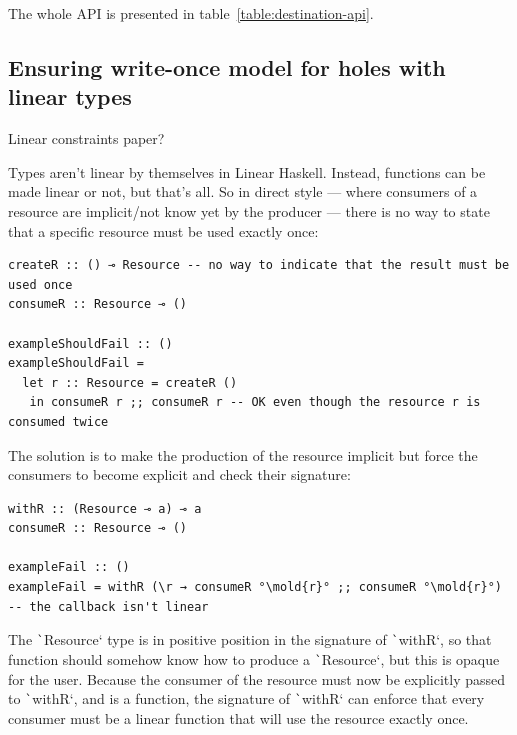 \documentclass[english]{jflart}
\newcommand{\TODO}[1]{{\color{red}\large #1}}
\newcommand{\mold}[1]{\colorbox{red}{#1}}
\begin{document}
The whole API is presented in table~\ref{table:destination-api}.

\subsection{Ensuring write-once model for holes with linear types}\label{ssec:api-linearity}

\TODO{Linear constraints paper?}\cite{spiwack_linearly_2022}

Types aren't linear by themselves in Linear Haskell. Instead, functions can be made linear or not, but that's all. So in direct style --- where consumers of a resource are implicit/not know yet by the producer --- there is no way to state that a specific resource must be used exactly once:

{\small
\begin{verbatim}
createR :: () ⊸ Resource -- no way to indicate that the result must be used once
consumeR :: Resource ⊸ ()

exampleShouldFail :: ()
exampleShouldFail =
  let r :: Resource = createR ()
   in consumeR r ;; consumeR r -- OK even though the resource r is consumed twice
\end{verbatim}
}

The solution is to make the production of the resource implicit but force the consumers to become explicit and check their signature:

{\small
\begin{verbatim}
withR :: (Resource ⊸ a) ⊸ a
consumeR :: Resource ⊸ ()

exampleFail :: ()
exampleFail = withR (\r → consumeR °\mold{r}° ;; consumeR °\mold{r}°) -- the callback isn't linear
\end{verbatim}
}

The \texttt`Resource` type is in positive position in the signature of \texttt`withR`, so that function should somehow know how to produce a \texttt`Resource`, but this is opaque for the user. Because the consumer of the resource must now be explicitly passed to \texttt`withR`, and is a function, the signature of \texttt`withR` can enforce that every consumer must be a linear function that will use the resource exactly once.
\end{document}
